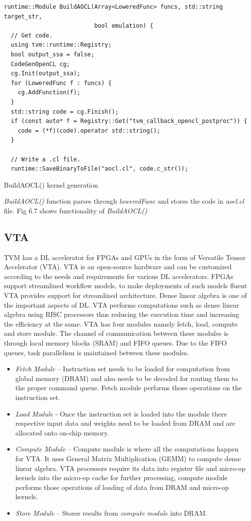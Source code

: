  \begin{code}[!htb]
 \begin{verbatim}
runtime::Module BuildAOCL(Array<LoweredFunc> funcs, std::string target_str,
                          bool emulation) {
  // Get code.
  using tvm::runtime::Registry;
  bool output_ssa = false;
  CodeGenOpenCL cg;
  cg.Init(output_ssa);
  for (LoweredFunc f : funcs) {
    cg.AddFunction(f);
  }
  std::string code = cg.Finish();
  if (const auto* f = Registry::Get("tvm_callback_opencl_postproc")) {
    code = (*f)(code).operator std::string();
  }

  // Write a .cl file.
  runtime::SaveBinaryToFile("aocl.cl", code.c_str());
\end{verbatim}
\caption{BuildAOCL() kernel generation \cite{tvm_code}}
\label{code:TVMCodegenBildAOCL}
\end{code}

\textit{BuildAOCL()} function parses through \textit{loweredFunc} and stores the code in \textit{aocl.cl} file. Fig 6.7 shows functionality of \textit{BuildAOCL()}

 \subsection{VTA}
TVM has a DL accelerator for FPGAs and GPUs in the form of Versatile Tensor Accelerator (VTA). VTA is an open-source hardware and can be customized according to the needs and requirements for various DL accelerators. FPGAs support streamlined workflow models, to make deployments of such models fluent VTA provides support for streamlined architecture. Dense linear algebra is one of the important aspects of DL. VTA performs computations such as dense linear algebra using RISC processors thus reducing the execution time and increasing the efficiency at the same. VTA has four modules namely fetch, load, compute and store module. The channel of communication between these modules is through local memory blocks (SRAM) and FIFO queues. Due to the FIFO queues, task parallelism is maintained between these modules.
\begin{itemize}
\item \textit{Fetch Module} – Instruction set needs to be loaded for computation from global memory (DRAM) and also needs to be decoded for routing them to the proper command queue. Fetch module performs those operations on the instruction set.
\item \textit{Load Module} - Once the instruction set is loaded into the module there respective input data and weights need to be loaded from DRAM and are allocated onto on-chip memory.
\item \textit{Compute Module} – Compute module is where all the computations happen for VTA. It uses General Matrix Multiplication (GEMM) to compute dense linear algebra. VTA processors require its data into register file and micro-op kernels into the micro-op cache for further processing, compute module performs those operations of loading of data from DRAM and micro-op kernels.
\item \textit{Store Module} – Stores results from \textit{compute module} into DRAM.
 \end{itemize}
 
